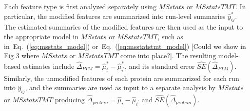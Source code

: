 \documentclass[mcp]{article}
\numberwithin{table}{section}
\def\todo#1{{\color{red}[#1]}}
\def\eqref#1{Eq.~(\ref{eq:#1})}
\begin{document}
Each feature type is first analyzed separately using $MSstats$ or $MSstatsTMT$. In particular, the modified features are summarized into run-level summaries $\hat{y}_{ij}^{\ast}$. The estimated summaries of the modified features are then used as the input to the appropriate model in $MSstats$ or $MSstatsTMT$,  such as in~\eqref{msstats_model} or~\eqref{msstatstmt_model} \todo{Could we show in Fig 3 where $MSstats$ or $MSstatsTMT$ come into place?}. The resulting model-based estimates include $\hat{\Delta}_{PTM}=\hat{\mu}^{\ast}_{i}-\hat{\mu}_{i^{\prime}}^{\ast}$, and its standard error $\widehat{SE}(\hat{\Delta}_{PTM})$. Similarly, the unmodified features of each protein are summarized for each run into $\hat{y}_{ij}$, and the summaries are used as input to a separate analysis by $MSstats$ or $MSstatsTMT$ producing $\hat{\Delta}_{protein}=\hat{\mu}_{i}-\hat{\mu}_{i^{\prime}}$ and $\widehat{SE}(\hat{\Delta}_{protein})$. 
\end{document}
